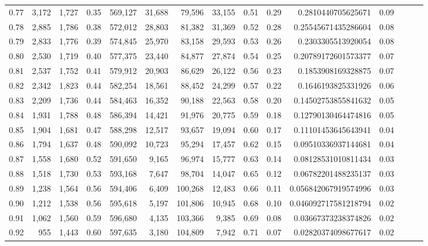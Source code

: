 \begin{tabular}{rrrrrrrrrrrrrrr}
0.77 &   3,172 &  1,727 &  0.35 &  569,127 &   31,688 &   79,596 &   33,155 &  0.51 &  0.29 &      0.2810440705625671 &      0.09 \\
0.78 &   2,885 &  1,786 &  0.38 &  572,012 &   28,803 &   81,382 &   31,369 &  0.52 &  0.28 &     0.25545671435286604 &      0.08 \\
0.79 &   2,833 &  1,776 &  0.39 &  574,845 &   25,970 &   83,158 &   29,593 &  0.53 &  0.26 &      0.2303305513920054 &      0.08 \\
0.80 &   2,530 &  1,719 &  0.40 &  577,375 &   23,440 &   84,877 &   27,874 &  0.54 &  0.25 &     0.20789172601573377 &      0.07 \\
0.81 &   2,537 &  1,752 &  0.41 &  579,912 &   20,903 &   86,629 &   26,122 &  0.56 &  0.23 &      0.1853908169328875 &      0.07 \\
0.82 &   2,342 &  1,823 &  0.44 &  582,254 &   18,561 &   88,452 &   24,299 &  0.57 &  0.22 &      0.1646193825331926 &      0.06 \\
0.83 &   2,209 &  1,736 &  0.44 &  584,463 &   16,352 &   90,188 &   22,563 &  0.58 &  0.20 &     0.14502753855841632 &      0.05 \\
0.84 &   1,931 &  1,788 &  0.48 &  586,394 &   14,421 &   91,976 &   20,775 &  0.59 &  0.18 &     0.12790130464474816 &      0.05 \\
0.85 &   1,904 &  1,681 &  0.47 &  588,298 &   12,517 &   93,657 &   19,094 &  0.60 &  0.17 &     0.11101453645643941 &      0.04 \\
0.86 &   1,794 &  1,637 &  0.48 &  590,092 &   10,723 &   95,294 &   17,457 &  0.62 &  0.15 &     0.09510336937144681 &      0.04 \\
0.87 &   1,558 &  1,680 &  0.52 &  591,650 &    9,165 &   96,974 &   15,777 &  0.63 &  0.14 &     0.08128531010811434 &      0.03 \\
0.88 &   1,518 &  1,730 &  0.53 &  593,168 &    7,647 &   98,704 &   14,047 &  0.65 &  0.12 &     0.06782201488235137 &      0.03 \\
0.89 &   1,238 &  1,564 &  0.56 &  594,406 &    6,409 &  100,268 &   12,483 &  0.66 &  0.11 &    0.056842067919574996 &      0.03 \\
0.90 &   1,212 &  1,538 &  0.56 &  595,618 &    5,197 &  101,806 &   10,945 &  0.68 &  0.10 &    0.046092717581218794 &      0.02 \\
0.91 &   1,062 &  1,560 &  0.59 &  596,680 &    4,135 &  103,366 &    9,385 &  0.69 &  0.08 &     0.03667373238374826 &      0.02 \\
0.92 &     955 &  1,443 &  0.60 &  597,635 &    3,180 &  104,809 &    7,942 &  0.71 &  0.07 &     0.02820374098677617 &      0.02 \\

\end{tabular}
